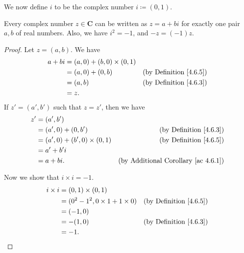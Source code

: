 \begin{note}
    We now define \(i\) to be the complex number \(i \coloneqq (0, 1)\).
\end{note}

\begin{lemma}\label{4.6.7}
    Every complex number \(z \in \mathbf{C}\) can be written as \(z = a + bi\) for exactly one pair \(a, b\) of real numbers.
    Also, we have \(i^2 = -1\), and \(-z = (-1)z\).
\end{lemma}

\begin{proof}
    Let \(z = (a, b)\).
    We have
    \begin{align*}
        a + bi & = (a, 0) + (b, 0) \times (0, 1)                                      \\
               & = (a, 0) + (0, b)               & \text{(by Definition \ref{4.6.5})} \\
               & = (a, b)                        & \text{(by Definition \ref{4.6.3})} \\
               & = z.
    \end{align*}
    If \(z' = (a', b')\) such that \(z = z'\), then we have
    \begin{align*}
        z' & = (a', b')                                                                          \\
           & = (a', 0) + (0, b')               & \text{(by Definition \ref{4.6.3})}              \\
           & = (a', 0) + (b', 0) \times (0, 1) & \text{(by Definition \ref{4.6.5})}              \\
           & = a' + b' i                                                                         \\
           & = a + bi.                         & \text{(by Additional Corollary \ref{ac 4.6.1})}
    \end{align*}

    Now we show that \(i \times i = -1\).
    \begin{align*}
        i \times i & = (0, 1) \times (0, 1)                                                      \\
                   & = (0^2 - 1^2, 0 \times 1 + 1 \times 0) & \text{(by Definition \ref{4.6.5})} \\
                   & = (-1, 0)                                                                   \\
                   & = -(1, 0)                              & \text{(by Definition \ref{4.6.3})} \\
                   & = -1.
    \end{align*}


\end{proof}
